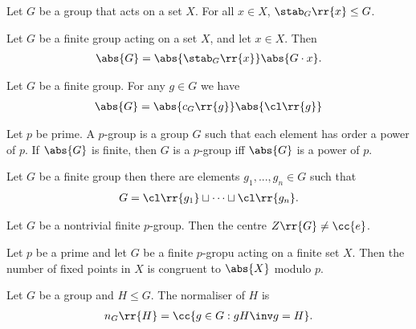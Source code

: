 \documentclass{article}
\begin{document}
\begin{lemma}
  Let $G$ be a group that acts on a set $X$. For all $x\in X$, $\stab_G\rr{x}\leq G$.
\end{lemma}

\begin{theorem}
  Let $G$ be a finite group acting on a set $X$, and let $x\in X$. Then
  \begin{align*}
    \abs{G}=\abs{\stab_G\rr{x}}\abs{G\cdot x}.
  \end{align*}
\end{theorem}

\begin{lemma}
  Let $G$ be a finite group. For any $g\in G$ we have
  \begin{align*}
    \abs{G}=\abs{c_G\rr{g}}\abs{\cl\rr{g}}
  \end{align*}
\end{lemma}

\begin{definition}
  \label{def:p-group}
  Let $p$ be prime. A $p$-group is a group $G$ such that each element has order a power of $p$.
  If $\abs{G}$ is finite, then $G$ is a $p$-group iff $\abs{G}$ is a power of $p$.
\end{definition}

\begin{theorem}
  Let $G$ be a finite group then there are elements $g_1,...,g_n\in G$ such that
  \begin{align*}
    G = \cl\rr{g_1}\sqcup\cdots\sqcup\cl\rr{g_n}.
  \end{align*}
\end{theorem}

\begin{theorem}
  Let $G$ be a nontrivial finite $p$-group. Then the centre $Z\rr{G}\neq \cc{e}$.
\end{theorem}

\begin{lemma}
  Let $p$ be a prime and let $G$ be a finite $p$-gropu acting on a finite set $X$. Then the
  number of fixed points in $X$ is congruent to $\abs{X}$ modulo $p$.
\end{lemma}

\begin{definition}
  \label{def:normaliser}
  Let $G$ be a group and $H\leq G$. The normaliser of $H$ is
  \begin{align*}
    n_G\rr{H}=\cc{g\in G : gH\inv g = H}.
  \end{align*}
\end{definition}
\end{document}
